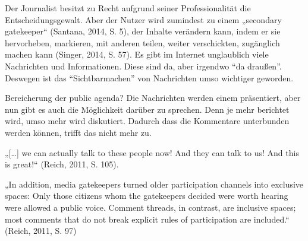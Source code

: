 Der Journalist besitzt zu Recht aufgrund seiner Professionalität die
Entscheidungsgewalt. Aber der Nutzer wird zumindest zu einem „secondary
gatekeeper“ (Santana, 2014, S. 5), der Inhalte verändern kann, indem er sie
hervorheben, markieren, mit anderen teilen, weiter verschickten, zugänglich
machen kann (Singer, 2014, S. 57). 
Es gibt im Internet unglaublich viele Nachrichten und Informationen. Diese sind da,
aber irgendwo ``da draußen''. Deswegen ist das ``Sichtbarmachen'' von Nachrichten
umso wichtiger geworden. 










Bereicherung der public agenda? Die Nachrichten werden einem präsentiert, aber
nun gibt es auch die Möglichkeit darüber zu sprechen. Denn je mehr berichtet
wird, umso mehr wird diskutiert. Dadurch dass die Kommentare unterbunden werden
können, trifft das nicht mehr zu.



„[\ldots] we can actually talk to these people now! And they can talk to us! And
this is great!“ (Reich, 2011, S. 105).

„In addition, media gatekeepers  turned older participation channels into
exclusive spaces: Only those citizens whom the gatekeepers decided were
worth hearing were allowed a public voice. Comment threads, in contrast,
are inclusive spaces; most comments that do not break explicit rules of
participation are included.“ (Reich, 2011, S. 97)


























